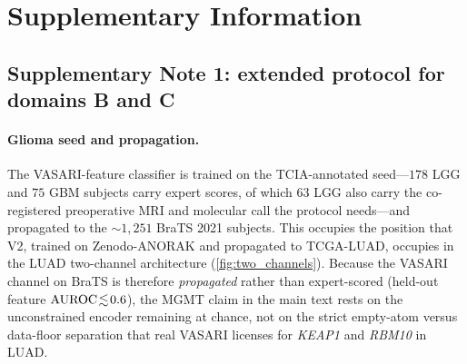 \clearpage
\setcounter{figure}{0}
\setcounter{table}{0}
\renewcommand{\thefigure}{S\arabic{figure}}
\renewcommand{\thetable}{S\arabic{table}}

\section*{Supplementary Information}


\subsection*{Supplementary Note 1: extended protocol for domains B and C}

\paragraph{Glioma seed and propagation.}
The VASARI-feature classifier is trained on the TCIA-annotated seed---$178$
LGG and $75$ GBM subjects carry expert scores, of which $63$ LGG also carry
the co-registered preoperative MRI and molecular call the protocol
needs---and propagated to the ${\sim}1{,}251$ BraTS 2021
subjects.\cite{baid2021brats} This occupies the position that \fuzzyarc{}\,V2,
trained on Zenodo-ANORAK and propagated to TCGA-LUAD, occupies in the LUAD
two-channel architecture (\cref{fig:two_channels}). Because the VASARI
channel on BraTS is therefore \emph{propagated} rather than expert-scored
(held-out feature $\text{AUROC}\!\lesssim\!0.6$), the MGMT claim in the main text
rests on the unconstrained encoder remaining at chance, not on the strict
empty-atom versus data-floor separation that real VASARI licenses for
\textit{KEAP1} and \textit{RBM10} in LUAD.

